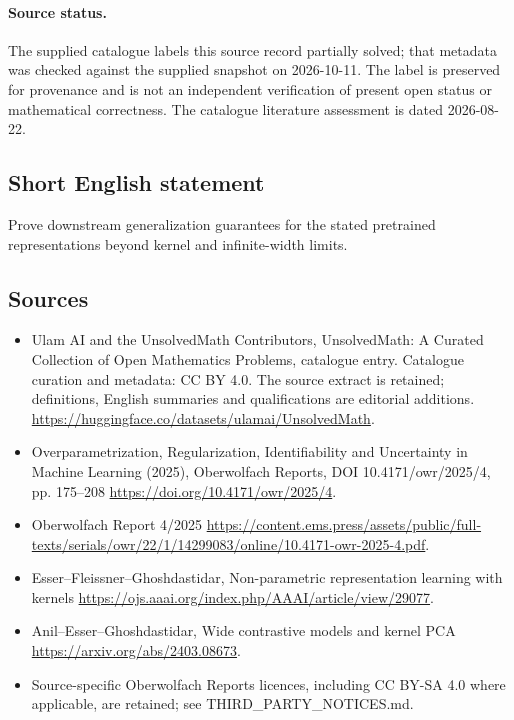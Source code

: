 \documentclass[11pt]{article}
\begin{document}
\paragraph{Source status.}
The supplied catalogue labels this source record partially solved; that metadata was checked against the supplied snapshot on 2026-10-11. The label is preserved for provenance and is not an independent verification of present open status or mathematical correctness. The catalogue literature assessment is dated 2026-08-22.
\subsection{Short English statement}
Prove downstream generalization guarantees for the stated pretrained representations beyond kernel and infinite-width limits.
\subsection{Sources}
\begin{itemize}
\item[S1] Ulam AI and the UnsolvedMath Contributors, UnsolvedMath: A Curated Collection of Open Mathematics Problems, catalogue entry. Catalogue curation and metadata: CC BY 4.0. The source extract is retained; definitions, English summaries and qualifications are editorial additions.
\url{https://huggingface.co/datasets/ulamai/UnsolvedMath}.
\item[S2] Overparametrization, Regularization, Identifiability and Uncertainty in Machine Learning (2025), Oberwolfach Reports, DOI 10.4171/owr/2025/4, pp. 175--208
\url{https://doi.org/10.4171/owr/2025/4}.
\item[S3] Oberwolfach Report 4/2025
\url{https://content.ems.press/assets/public/full-texts/serials/owr/22/1/14299083/online/10.4171-owr-2025-4.pdf}.
\item[S4] Esser--Fleissner--Ghoshdastidar, Non-parametric representation learning with kernels
\url{https://ojs.aaai.org/index.php/AAAI/article/view/29077}.
\item[S5] Anil--Esser--Ghoshdastidar, Wide contrastive models and kernel PCA
\url{https://arxiv.org/abs/2403.08673}.
\item Source-specific Oberwolfach Reports licences, including CC BY-SA 4.0 where applicable, are retained; see THIRD\_PARTY\_NOTICES.md.
\end{itemize}
\end{document}
